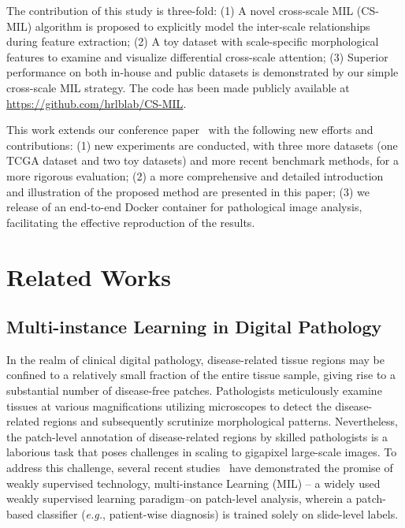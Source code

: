 \documentclass[times,twocolumn,final]{elsarticle}
\begin{document}
The contribution of this study is three-fold: (1) A novel cross-scale MIL (CS-MIL) algorithm is proposed to explicitly model the inter-scale relationships during feature extraction; (2) A toy dataset with scale-specific morphological features to examine and visualize differential cross-scale attention; (3) Superior performance on both in-house and public datasets is demonstrated by our simple cross-scale MIL strategy. The code has been made publicly available at \url{https://github.com/hrlblab/CS-MIL}.

This work extends our conference paper~\citep{deng2022cross} with the following new efforts and contributions: (1) new experiments are conducted, with three more datasets (one TCGA dataset and two toy datasets) and more recent benchmark methods, for a more rigorous evaluation; (2) a more comprehensive and detailed introduction and illustration of the proposed method are presented in this paper; (3) we release of an end-to-end Docker container for pathological image analysis, facilitating the effective reproduction of the results.


\section{Related Works}
\subsection{Multi-instance Learning in Digital Pathology}
In the realm of clinical digital pathology, disease-related tissue regions may be confined to a relatively small fraction of the entire tissue sample, giving rise to a substantial number of disease-free patches. Pathologists meticulously examine tissues at various magnifications utilizing microscopes to detect the disease-related regions and subsequently scrutinize morphological patterns. Nevertheless, the patch-level annotation of disease-related regions by skilled pathologists is a laborious task that poses challenges in scaling to gigapixel large-scale images. To address this challenge, several recent studies~\citep{hou2016patch,campanella2019clinical,hashimoto2020multi,wang2019rmdl,skrede2020deep,lu2021data,lu2021ai} have demonstrated the promise of weakly supervised technology, multi-instance Learning (MIL) -- a widely used weakly supervised learning paradigm--on patch-level analysis, wherein a patch-based classifier (\textit{e.g.}, patient-wise diagnosis) is trained solely on slide-level labels.
\end{document}
